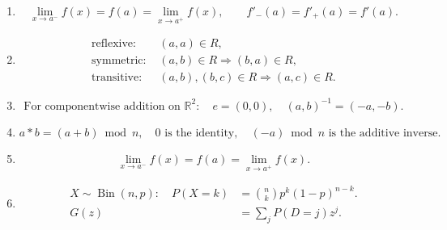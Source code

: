 \begin{enumerate}[label=\theenumi,leftmargin=4mm,itemsep=4pt]
\begin{equation}
A=\int_a^b|y_{\mathrm{upper}}-y_{\mathrm{lower}}|\,dx.
\label{eq:area-between-47}
\end{equation}

\setcounter{enumi}{47}\item

\begin{equation}
\lim_{x\to a^-}f(x)=f(a)=\lim_{x\to a^+}f(x),\qquad
f'_{-}(a)=f'_{+}(a)=f'(a).
\label{eq:continuity-differentiability-48}
\end{equation}

\setcounter{enumi}{48}\item

\begin{equation}
\begin{aligned}
\text{reflexive: }&(a,a)\in R,\\
\text{symmetric: }&(a,b)\in R\Rightarrow(b,a)\in R,\\
\text{transitive: }&(a,b),(b,c)\in R\Rightarrow(a,c)\in R.
\end{aligned}
\label{eq:relation-properties-49}
\end{equation}

\setcounter{enumi}{49}\item

\begin{equation}
\text{For componentwise addition on }\mathbb R^2:\quad
e=(0,0),\quad(a,b)^{-1}=(-a,-b).
\label{eq:componentwise-operation-50}
\end{equation}

\setcounter{enumi}{50}\item

\begin{equation}
a*b=(a+b)\bmod n,\quad
0\text{ is the identity},\quad
(-a)\bmod n\text{ is the additive inverse}.
\label{eq:modular-operation-51}
\end{equation}

\setcounter{enumi}{51}\item

\begin{equation}
\lim_{x\to a^-}f(x)=f(a)=\lim_{x\to a^+}f(x).
\label{eq:continuity-limits-52}
\end{equation}

\setcounter{enumi}{52}\item

\begin{align}
X\sim\operatorname{Bin}(n,p):\quad
P(X=k)&=\binom nkp^k(1-p)^{n-k}.
\label{eq:binomial-53}\\
G(z)&=\sum_jP(D=j)z^j.
\label{eq:walk-pgf}
\end{align}


\end{enumerate}
